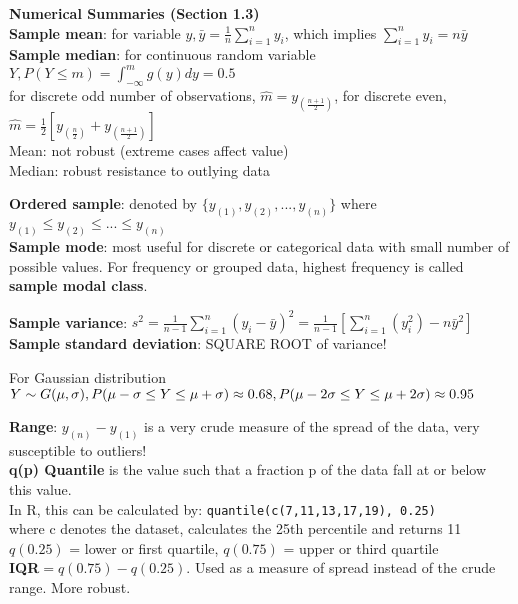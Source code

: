 \documentclass[a4paper,12pt]{article}
\begin{document}
\bigskip 
\textbf{Numerical Summaries (Section 1.3)}
\bigskip
\\\textbf{Sample mean}: for variable $y, \bar{y} = \frac{1}{n} \sum^{n}_{i=1} y_i$, which implies $\sum^{n}_{i=1} y_i = n\bar{y}$
\\\textbf{Sample median}: for continuous random variable $Y, P(Y \leq m) = \int_{-\infty}^{m} g(y)dy = 0.5$
\\ for discrete odd number of observations, $\hat{m} = y_{(\frac{n+1}{2})}$, for discrete even, $\hat{m} = \frac{1}{2}[y_{(\frac{n}{2})} + y_{(\frac{n+1}{2})}]$
\\Mean: not robust (extreme cases affect value)
\\Median: robust resistance to outlying data
\bigskip

\textbf{Ordered sample}: denoted by $\{y_{(1)}, y_{(2)},...,y_{(n)}\}$ where $y_{(1)}\leq y_{(2)}\leq...\leq y_{(n)}$
\\\textbf{Sample mode}: most useful for discrete or categorical data
with small number of possible values. For frequency or grouped data, highest frequency is called \textbf{sample modal class}.

\newpage
\textbf{Sample variance}: $s^2 = \frac{1}{n-1}\sum_{i=1}^n(y_i-\bar{y})^2 = \frac{1}{n-1}[\sum_{i=1}^n(y_i^2)-n\bar{y}^2]$
\\\textbf{Sample standard deviation}: SQUARE ROOT of variance!
\bigskip

For Gaussian distribution $Y \sim G(\mu, \sigma), 
\\P(\mu - \sigma \leq Y \leq \mu + \sigma) \approx 0.68, P(\mu - 2\sigma \leq Y \leq \mu + 2\sigma) \approx 0.95$
\bigskip

\textbf{Range}: $y_{(n)} - y_{(1)}$ is a very crude measure of the spread of the data, very susceptible to outliers!
\\

\textbf{q(p) Quantile} is the value
such that a fraction p of the data fall at or below this value.
\\In R, this can be calculated by: \texttt{quantile(c(7,11,13,17,19), 0.25)} \\where c denotes the dataset, calculates the 25th percentile and returns 11
\\$q(0.25)$ = lower or first quartile, $q(0.75)$ = upper or third quartile
\\\textbf{IQR}$ = q(0.75) - q(0.25)$. Used as a measure of spread instead of the crude
range. More robust.
\\
\end{document}
